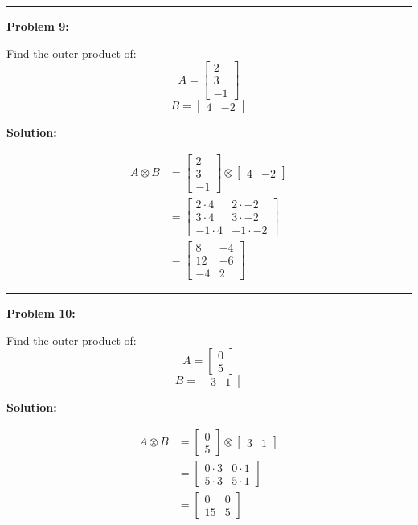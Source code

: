 \documentclass[
  letterpaper,
  DIV=11,
  numbers=noendperiod]{scrreprt}
\theoremstyle{plain}
\theoremstyle{definition}
\theoremstyle{remark}
\begin{document}
\begin{center}\rule{0.5\linewidth}{0.5pt}\end{center}

\textbf{Problem 9:}

Find the outer product of: \[A=\begin{bmatrix}2\\3\\-1\end{bmatrix}\]
\[B=\begin{bmatrix}4&-2\end{bmatrix}\]

\textbf{Solution:}

\begin{align*}
A \otimes B &= \begin{bmatrix}2\\3\\-1\end{bmatrix} \otimes \begin{bmatrix}4&-2\end{bmatrix} \\
&= \begin{bmatrix}
2 \cdot 4 & 2 \cdot -2 \\
3 \cdot 4 & 3 \cdot -2 \\
-1 \cdot 4 & -1 \cdot -2
\end{bmatrix} \\
&= \begin{bmatrix}
8 & -4 \\
12 & -6 \\
-4 & 2
\end{bmatrix}
\end{align*}

\begin{center}\rule{0.5\linewidth}{0.5pt}\end{center}

\textbf{Problem 10:}

Find the outer product of: \[A=\begin{bmatrix}0\\5\end{bmatrix}\]
\[B=\begin{bmatrix}3&1\end{bmatrix}\]

\textbf{Solution:}

\begin{align*}
A \otimes B &= \begin{bmatrix}0\\5\end{bmatrix} \otimes \begin{bmatrix}3&1\end{bmatrix} \\
&= \begin{bmatrix}
0 \cdot 3 & 0 \cdot 1 \\
5 \cdot 3 & 5 \cdot 1
\end{bmatrix} \\
&= \begin{bmatrix}
0 & 0 \\
15 & 5
\end{bmatrix}
\end{align*}
\end{document}
